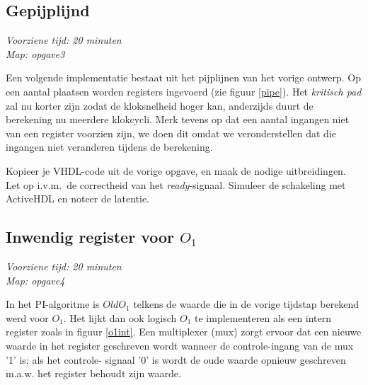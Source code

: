 \subsection{Gepijplijnd}
{\em Voorziene tijd: 20 minuten} \\
{\em Map: opgave3}

Een volgende implementatie bestaat uit het pijplijnen van het vorige
ontwerp.  Op een aantal plaatsen worden registers ingevoerd (zie
figuur \ref{pipe}).  Het {\em kritisch pad} zal nu korter zijn zodat
de kloksnelheid hoger kan, anderzijds duurt de berekening nu meerdere
klokcycli. Merk tevens op dat een aantal ingangen niet van een
register voorzien zijn, we doen dit omdat we veronderstellen dat die
ingangen niet veranderen tijdens de berekening.


Kopieer je VHDL-code uit de vorige opgave, en maak de nodige
uitbreidingen.  Let op i.v.m.\ de correctheid van het {\em
ready}-signaal.  Simuleer de schakeling met ActiveHDL en noteer de
latentie.

\subsection{Inwendig register voor $O_1$}
\label{sec:opgave_oint}
{\em Voorziene tijd: 20 minuten} \\
{\em Map: opgave4}


In het PI-algoritme is $OldO_1$ telkens de waarde die in de vorige
tijdstap berekend werd voor $O_1$. Het lijkt dan ook logisch $O_1$ te
implementeren als een intern register zoals in figuur \ref{o1int}. Een
multiplexer (mux) zorgt ervoor dat een nieuwe waarde in het register
geschreven wordt wanneer de controle-ingang van de mux '1' is; als het
controle- signaal '0' is wordt de oude waarde opnieuw geschreven
m.a.w. het register behoudt zijn waarde.

